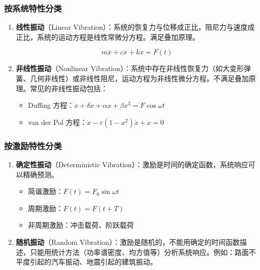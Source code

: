 \subsubsection{按系统特性分类}

\begin{enumerate}
    \item \textbf{线性振动}（Linear Vibration）：系统的恢复力与位移成正比，阻尼力与速度成正比，系统的运动方程是线性常微分方程。满足叠加原理。
    \begin{myformula}
        \[
        m\ddot{x} + c\dot{x} + kx = F(t)
        \]
    \end{myformula}
    
    \item \textbf{非线性振动}（Nonlinear Vibration）：系统中存在非线性恢复力（如大变形弹簧、几何非线性）或非线性阻尼，运动方程为非线性微分方程。不满足叠加原理。常见的非线性振动包括：
    \begin{itemize}
        \item Duffing 方程：$\ddot{x} + \delta\dot{x} + \alpha x + \beta x^3 = F\cos\omega t$
        \item van der Pol 方程：$\ddot{x} - \varepsilon(1-x^2)\dot{x} + x = 0$
    \end{itemize}
\end{enumerate}

\subsubsection{按激励特性分类}

\begin{enumerate}
    \item \textbf{确定性振动}（Deterministic Vibration）：激励是时间的确定函数，系统响应可以精确预测。
    \begin{itemize}
        \item 简谐激励：$F(t) = F_0\sin\omega t$
        \item 周期激励：$F(t) = F(t+T)$
        \item 非周期激励：冲击载荷、阶跃载荷
    \end{itemize}
    
    \item \textbf{随机振动}（Random Vibration）：激励是随机的，不能用确定的时间函数描述，只能用统计方法（功率谱密度、均方值等）分析系统响应。例如：路面不平度引起的汽车振动、地震引起的建筑振动。
\end{enumerate}

